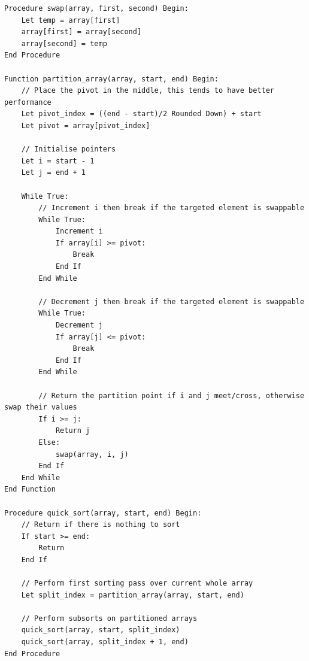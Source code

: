 \documentclass[
]{article}
\begin{document}
\begin{verbatim}
Procedure swap(array, first, second) Begin:
    Let temp = array[first]
    array[first] = array[second]
    array[second] = temp
End Procedure

Function partition_array(array, start, end) Begin:
    // Place the pivot in the middle, this tends to have better performance
    Let pivot_index = ((end - start)/2 Rounded Down) + start
    Let pivot = array[pivot_index]
    
    // Initialise pointers
    Let i = start - 1
    Let j = end + 1
    
    While True:
        // Increment i then break if the targeted element is swappable
        While True:
            Increment i
            If array[i] >= pivot:
                Break
            End If
        End While
        
        // Decrement j then break if the targeted element is swappable
        While True:
            Decrement j
            If array[j] <= pivot:
                Break
            End If
        End While
        
        // Return the partition point if i and j meet/cross, otherwise swap their values
        If i >= j:
            Return j
        Else:
            swap(array, i, j)
        End If
    End While
End Function

Procedure quick_sort(array, start, end) Begin:
    // Return if there is nothing to sort
    If start >= end:
        Return
    End If
    
    // Perform first sorting pass over current whole array
    Let split_index = partition_array(array, start, end)
    
    // Perform subsorts on partitioned arrays
    quick_sort(array, start, split_index)
    quick_sort(array, split_index + 1, end)
End Procedure
\end{verbatim}
\end{document}
